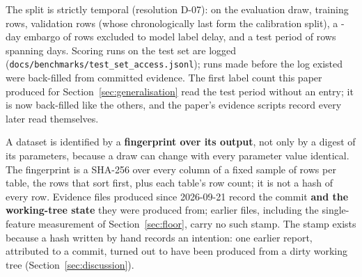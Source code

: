 The split is strictly temporal (resolution D-07): on the evaluation draw, \nTrainRows{} training
rows, \nValRows{} validation rows (whose chronologically last \nCalRows{} form the calibration
split), a \nEmbargoDays{}-day embargo of \nEmbargoRows{} rows excluded to model label delay, and a
test period of \nTestRows{} rows spanning \nTestSpanDays{} days. Scoring runs on the test set are
logged (\texttt{docs/benchmarks/test\_set\_access.jsonl}); runs made before the log existed were
back-filled from committed evidence. The first label count this paper produced for
Section~\ref{sec:generalisation} read the test period without an entry; it is now back-filled like
the others, and the paper's evidence scripts record every later read themselves.

A dataset is identified by a \textbf{fingerprint over its output}, not only by a digest of its
parameters, because a draw can change with every parameter value identical. The fingerprint is a
SHA-256 over every column of a fixed sample of \nFingerprintSampleRows{} rows per table, the rows
that sort first, plus each table's row count; it is not a hash of every row. Evidence files produced
since 2026-09-21 record the commit \textbf{and the working-tree state} they were produced from;
earlier files, including the single-feature measurement of Section~\ref{sec:floor}, carry no such
stamp. The stamp exists because a hash written by hand records an intention: one earlier report, attributed to a commit, turned out to
have been produced from a dirty working tree (Section~\ref{sec:discussion}).
